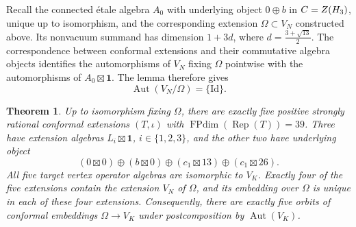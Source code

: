 \documentclass[leqno]{article}
\let\cal\relax
\newcommand{\cal}{\mathcal}
\newcommand{\Id}{\mathrm{Id}}
\DeclareMathOperator{\Rep}{Rep}
\newtheorem{thm}{Theorem}[section]
\numberwithin{equation}{section}
\begin{document}
Recall the connected \'etale algebra $A_0$ with underlying object $0\oplus b$ in $\cal C = Z(\cal H_3)$, unique up to isomorphism, and the corresponding extension $\Omega \subset V_N$ constructed above. Its nonvacuum summand has dimension $1+3d$, where $d = \frac{3+\sqrt{13}}{2}$. The correspondence between conformal extensions and their commutative algebra objects \cite{HKL15} identifies the automorphisms of $V_N$ fixing $\Omega$ pointwise with the automorphisms of $A_0\boxtimes\mathbf1$. The lemma therefore gives
\begin{equation}
\label{eq:relative-automorphism-N}
\operatorname{Aut}(V_N/\Omega) = \{\Id\}.
\end{equation}

\begin{thm}
\label{thm:five-dimension39-extensions}
Up to isomorphism fixing $\Omega$, there are exactly five positive strongly rational conformal extensions $(T,\iota)$ with $\operatorname{FPdim}(\Rep(T)) = 39$. Three have extension algebras $L_i\boxtimes\mathbf1$, $i \in \{1,2,3\}$, and the other two have underlying object
\begin{equation}
\label{eq:two-mixed-extension-object}
(0\boxtimes0)\oplus(b\boxtimes0)\oplus(c_1\boxtimes13)\oplus(c_1\boxtimes26).
\end{equation}
All five target vertex operator algebras are isomorphic to $V_K$. Exactly four of the five extensions contain the extension $V_N$ of $\Omega$, and its embedding over $\Omega$ is unique in each of these four extensions. Consequently, there are exactly five orbits of conformal embeddings $\Omega \to V_K$ under postcomposition by $\operatorname{Aut}(V_K)$.
\end{thm}
\end{document}
